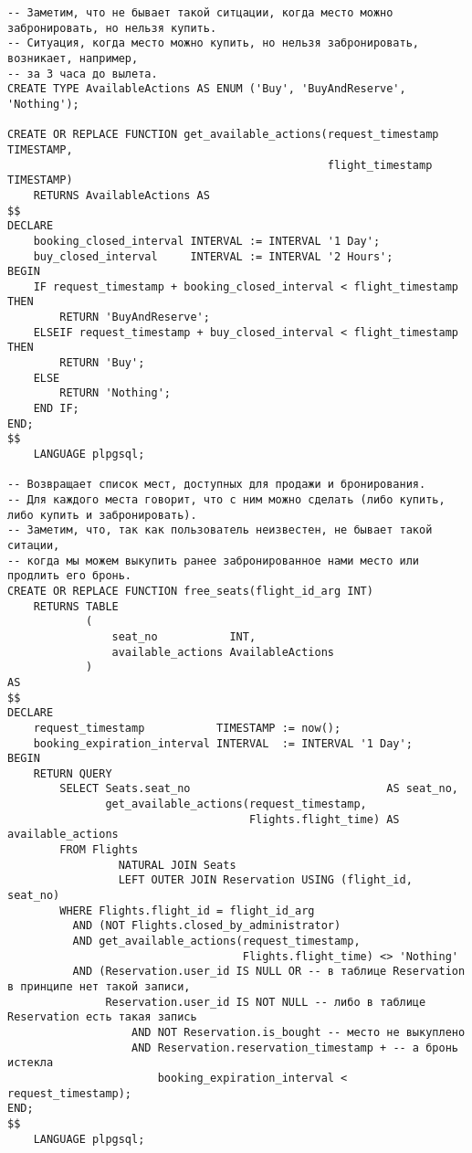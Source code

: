 \documentclass{article}
\begin{document}
\begin{verbatim}
-- Заметим, что не бывает такой ситцации, когда место можно забронировать, но нельзя купить.
-- Ситуация, когда место можно купить, но нельзя забронировать, возникает, например,
-- за 3 часа до вылета.
CREATE TYPE AvailableActions AS ENUM ('Buy', 'BuyAndReserve', 'Nothing');

CREATE OR REPLACE FUNCTION get_available_actions(request_timestamp TIMESTAMP,
                                                 flight_timestamp TIMESTAMP)
    RETURNS AvailableActions AS
$$
DECLARE
    booking_closed_interval INTERVAL := INTERVAL '1 Day';
    buy_closed_interval     INTERVAL := INTERVAL '2 Hours';
BEGIN
    IF request_timestamp + booking_closed_interval < flight_timestamp THEN
        RETURN 'BuyAndReserve';
    ELSEIF request_timestamp + buy_closed_interval < flight_timestamp THEN
        RETURN 'Buy';
    ELSE
        RETURN 'Nothing';
    END IF;
END;
$$
    LANGUAGE plpgsql;
    
-- Возвращает список мест, доступных для продажи и бронирования.
-- Для каждого места говорит, что с ним можно сделать (либо купить, либо купить и забронировать).
-- Заметим, что, так как пользователь неизвестен, не бывает такой ситации,
-- когда мы можем выкупить ранее забронированное нами место или продлить его бронь.
CREATE OR REPLACE FUNCTION free_seats(flight_id_arg INT)
    RETURNS TABLE
            (
                seat_no           INT,
                available_actions AvailableActions
            )
AS
$$
DECLARE
    request_timestamp           TIMESTAMP := now();
    booking_expiration_interval INTERVAL  := INTERVAL '1 Day';
BEGIN
    RETURN QUERY
        SELECT Seats.seat_no                              AS seat_no,
               get_available_actions(request_timestamp,
                                     Flights.flight_time) AS available_actions
        FROM Flights
                 NATURAL JOIN Seats
                 LEFT OUTER JOIN Reservation USING (flight_id, seat_no)
        WHERE Flights.flight_id = flight_id_arg
          AND (NOT Flights.closed_by_administrator)
          AND get_available_actions(request_timestamp,
                                    Flights.flight_time) <> 'Nothing'
          AND (Reservation.user_id IS NULL OR -- в таблице Reservation в принципе нет такой записи,
               Reservation.user_id IS NOT NULL -- либо в таблице Reservation есть такая запись
                   AND NOT Reservation.is_bought -- место не выкуплено
                   AND Reservation.reservation_timestamp + -- а бронь истекла
                       booking_expiration_interval < request_timestamp);
END;
$$
    LANGUAGE plpgsql;    
\end{verbatim}
\end{document}
